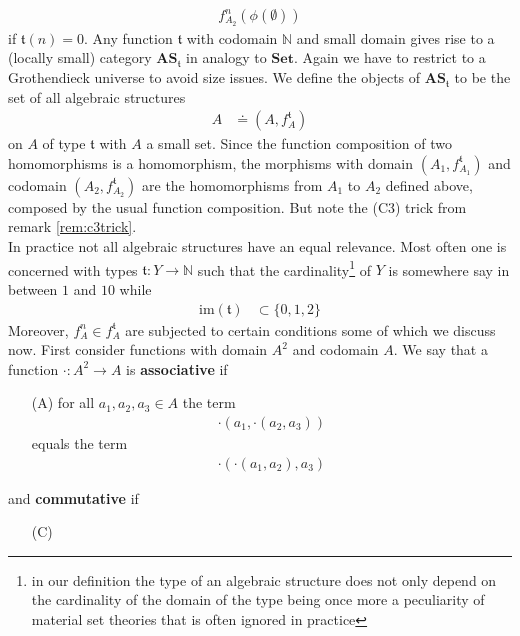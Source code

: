 \begin{exa}
\begin{align*}
  f_{A_{2}}^{n}
  \left(
    \phi(\emptyset)
  \right)
\end{align*}
if $\mathfrak{t}(n) = 0$. Any function $\mathfrak{t}$ with codomain $\mathbb{N}$ and small domain gives rise to a (locally small) category $\mathbf{AS}_{\mathfrak{t}}$ in analogy to $\mathbf{Set}$. Again we have to restrict to a Grothendieck universe to avoid size issues. We define the objects of $\mathbf{AS}_{\mathfrak{t}}$ to be the set of all algebraic structures
\begin{align*}
  A
  &\doteq
  (A,f_{A}^{\mathfrak{t}})
\end{align*}
on $A$ of type $\mathfrak{t}$ with $A$ a small set. Since the function composition of two homomorphisms is a homomorphism, the morphisms with domain $(A_{1},f_{A_{1}}^{\mathfrak{t}})$ and codomain $(A_{2},f_{A_{2}}^{\mathfrak{t}})$ are the homomorphisms from $A_{1}$ to $A_{2}$ defined above, composed by the usual function composition. But note the (C3) trick from remark \ref{rem:c3trick}.
\\
In practice not all algebraic structures have an equal relevance. Most often one is concerned with types $\mathfrak{t} \colon Y \rightarrow \mathbb{N}$ such that the cardinality\footnote{in our definition the type of an algebraic structure does not only depend on the cardinality of the domain of the type being once more a peculiarity of material set theories that is often ignored in practice} of $Y$ is somewhere say in between $1$ and $10$ while
\begin{align*}
  \mathrm{im}(\mathfrak{t})
  &\subset
  \lbrace
    0,1,2
  \rbrace
\end{align*}
Moreover, $f_{A}^{n} \in f_{A}^{\mathfrak{t}}$ are subjected to certain conditions some of which we discuss now. First consider functions with domain $A^{2}$ and codomain $A$. We say that a function $\cdot \colon A^{2} \rightarrow A$ is \textbf{associative} if
\begin{enumerate}
\item[(A)]
for all $a_{1},a_{2},a_{3} \in A$ the term
\begin{align*}
  \cdot
  \left(
    a_{1},
    \cdot(a_{2},a_{3})
  \right)
\end{align*}
equals the term
\begin{align*}
  \cdot
  \left(
    \cdot(a_{1},a_{2}),
    a_{3}
  \right)
\end{align*}
\end{enumerate}
and \textbf{commutative} if
\begin{enumerate}
\item[(C)]

\end{enumerate}
\end{exa}
